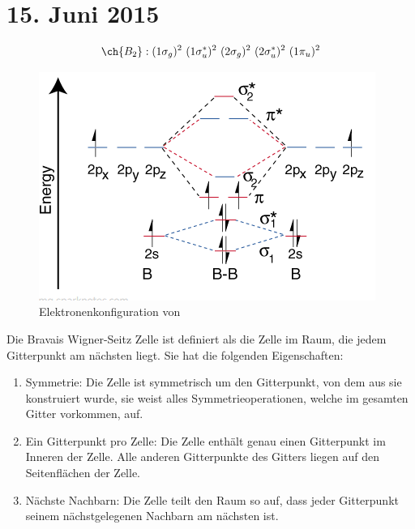 \section{15. Juni 2015}

\label{q:31}

\[\ch{B_2} : (1\sigma_g)^2 ~ (1\sigma_u^*)^2 ~ (2\sigma_g)^2 ~ (2\sigma_u^*)^2 ~ (1\pi_u)^2\]

\begin{figure}[H]
    \includegraphics[width=0.8\linewidth]{resources/15-06-2015/b2.PNG}
    \caption{Elektronenkonfiguration von }
\end{figure}

\label{q:32}

\label{q:33}

Die Bravais Wigner-Seitz Zelle ist definiert als die Zelle im Raum, die jedem Gitterpunkt am nächsten 
liegt. Sie hat die folgenden Eigenschaften:
\begin{enumerate}
    \item Symmetrie: Die Zelle ist symmetrisch um den Gitterpunkt, von dem aus sie konstruiert wurde, sie weist alles Symmetrieoperationen, welche im gesamten Gitter vorkommen, auf. 
    \item Ein Gitterpunkt pro Zelle: Die Zelle enthält genau einen Gitterpunkt im Inneren der Zelle. Alle anderen Gitterpunkte des Gitters liegen auf den Seitenflächen der Zelle.
    \item Nächste Nachbarn: Die Zelle teilt den Raum so auf, dass jeder Gitterpunkt seinem nächstgelegenen Nachbarn am nächsten ist.
\end{enumerate}

